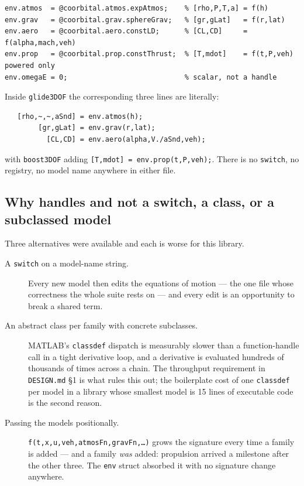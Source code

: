 \documentclass[11pt]{article}
\newcommand{\code}[1]{\texttt{#1}}
\begin{document}
\begin{lstlisting}
env.atmos  = @coorbital.atmos.expAtmos;    % [rho,P,T,a] = f(h)
env.grav   = @coorbital.grav.sphereGrav;   % [gr,gLat]   = f(r,lat)
env.aero   = @coorbital.aero.constLD;      % [CL,CD]     = f(alpha,mach,veh)
env.prop   = @coorbital.prop.constThrust;  % [T,mdot]    = f(t,P,veh)   powered only
env.omegaE = 0;                            % scalar, not a handle
\end{lstlisting}

Inside \code{glide3DOF} the corresponding three lines are literally:

\begin{lstlisting}
   [rho,~,~,aSnd] = env.atmos(h);
        [gr,gLat] = env.grav(r,lat);
          [CL,CD] = env.aero(alpha,V./aSnd,veh);
\end{lstlisting}

with \code{boost3DOF} adding \code{[T,mdot] = env.prop(t,P,veh);}. There is no
\code{switch}, no registry, no model name anywhere in either file.

\subsection{Why handles and not a switch, a class, or a subclassed model}
\label{sec:handles}

Three alternatives were available and each is worse for this library.

\begin{description}
\item[A \code{switch} on a model-name string.] Every new model then edits the
equations of motion --- the one file whose correctness the whole suite rests
on --- and every edit is an opportunity to break a shared term.

\item[An abstract class per family with concrete subclasses.] MATLAB's
\code{classdef} dispatch is measurably slower than a function-handle call in a
tight derivative loop, and a derivative is evaluated hundreds of thousands of
times across a chain. The throughput requirement in \code{DESIGN.md} \S1 is
what rules this out; the boilerplate cost of one \code{classdef} per model in a
library whose smallest model is 15 lines of executable code is the second
reason.

\item[Passing the models positionally.] \code{f(t,x,u,veh,atmosFn,gravFn,\dots)}
grows the signature every time a family is added --- and a family \emph{was}
added: propulsion arrived a milestone after the other three. The \code{env}
struct absorbed it with no signature change anywhere.
\end{description}
\end{document}
